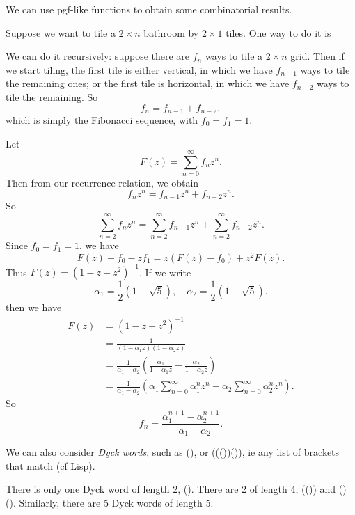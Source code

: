 \documentclass[a4paper]{article}
\begin{document}
We can use pgf-like functions to obtain some combinatorial results.
\begin{eg}
  Suppose we want to tile a $2\times n$ bathroom by $2\times 1$ tiles. One way to do it is
  \begin{center}
  \end{center}
  We can do it recursively: suppose there are $f_n$ ways to tile a $2\times n$ grid. Then if we start tiling, the first tile is either vertical, in which we have $f_{n - 1}$ ways to tile the remaining ones; or the first tile is horizontal, in which we have $f_{n - 2}$ ways to tile the remaining. So
  \[
    f_n = f_{n - 1} + f_{n - 2},
  \]
  which is simply the Fibonacci sequence, with $f_0 = f_1 = 1$. 

  Let
  \[
    F(z) = \sum_{n = 0}^\infty f_nz^n.
  \]
  Then from our recurrence relation, we obtain
  \[
    f_nz^n = f_{n - 1}z^n + f_{n - 2}z^n.
  \]
  So
  \[
    \sum_{n = 2}^\infty f_n z^n = \sum_{n = 2}^{\infty} f_{n - 1}z^n + \sum_{n = 2}^\infty f_{n - 2}z^n.
  \]
  Since $f_0 = f_1 = 1$, we have
  \[
    F(z) - f_0 - zf_1 = z(F(z) - f_0) + z^2F(z).
  \]
  Thus $F(z) = (1 - z - z^2)^{-1}$. If we write
  \[
    \alpha_1 = \frac{1}{2}(1 + \sqrt{5}),\quad \alpha_2 = \frac{1}{2}(1 - \sqrt{5}).
  \]
  then we have
  \begin{align*}
    F(z) &= (1 - z - z^2)^{-1}\\
    &= \frac{1}{(1 - \alpha_1 z)(1 - \alpha_2 z)}\\
    &= \frac{1}{\alpha_1 - \alpha_2}\left(\frac{\alpha_1}{1 - \alpha_1 z} - \frac{\alpha_2}{1 - \alpha_2 z}\right)\\
    &= \frac{1}{\alpha_1 - \alpha_2}\left(\alpha_1 \sum_{n = 0}^\infty \alpha_1^nz^n - \alpha_2\sum_{n = 0}^\infty \alpha_2^n z^n\right).
  \end{align*}
  So
  \[
    f_n = \frac{\alpha_1^{n + 1} - \alpha_2^{n + 1}}{ - \alpha_1 - \alpha_2}.
  \]
\end{eg}

We can also consider \emph{Dyck words}, such as (), or  ((())()), ie any list of brackets that match (cf Lisp).

There is only one Dyck word of length 2, (). There are 2 of length 4, (()) and ()(). Similarly, there are 5 Dyck words of length 5.
\end{document}
